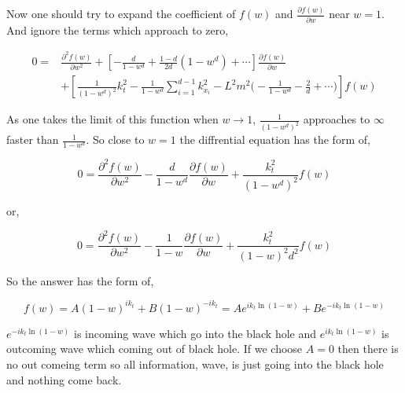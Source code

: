Now one should try to expand the coefficient of $f(w)$ and $\frac{\partial f(w)}{\partial w}$ near $w=1$. And ignore the terms which approach to zero,

\begin{align}
   0 =& \frac{\partial^2f(w)}{\partial w^2} + \left[- \frac{d}{1-w^d} + \frac{1-d}{2d}(1-w^d) + \dotsb \right]\frac{\partial f(w)}{\partial w} \\
   & + \left[ \frac{1}{(1-w^d)^2}k^2_t - \frac{1}{1-w^d}\sum\limits_{i=1}^{d-1}k^2_{x_i} - L^2m^2\big( -\frac{1}{1-w^d} -\frac{2}{d} + \dotsb\big) \right] f(w) \nonumber
\end{align}

As one takes the limit of this function when $w \rightarrow 1$, $\frac{1}{(1-w^d)^2}$ approaches to $\infty$ faster than $\frac{1}{1-w^d}$. So close to $w=1$ the diffrential equation has the form of,

\begin{equation}
   0 = \frac{\partial^2f(w)}{\partial w^2} - \frac{d}{1-w^d}\frac{\partial f(w)}{\partial w} + \frac{k^2_t}{(1-w^d)^2}f(w)
\end{equation}

or,

\begin{equation}
   0 = \frac{\partial^2f(w)}{\partial w^2} - \frac{1}{1-w}\frac{\partial f(w)}{\partial w} + \frac{k^2_t}{(1-w)^2d^2} f(w)
\end{equation}

So the answer has the form of,

\begin{equation}
   f(w) = A (1-w)^{ik_t} + B (1-w)^{-ik_t} = A e^{ik_t \ln{(1-w)}} + B e^{-ik_t \ln{(1-w)}} 
\end{equation}

$e^{-ik_t \ln{(1-w)}}$ is incoming wave which go into the black hole and $e^{ik_t \ln{(1-w)}}$ is outcoming wave which coming out of black hole. If we choose $A = 0$ then there is no out comeing term so all information, wave, is just going into the black hole and nothing come back.
